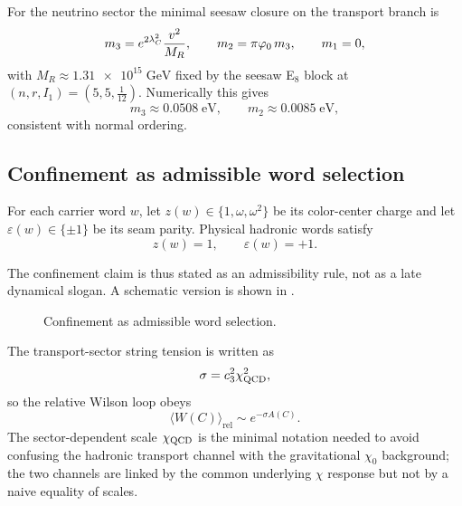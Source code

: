 For the neutrino sector the minimal seesaw closure on the transport branch is
\begin{equation}
\label{eq:neutrino-masses}
m_3=e^{2\lambda_C^2}\frac{v^2}{M_R},
\qquad
m_2=\pi\varphi_0\,m_3,
\qquad
m_1=0,
\end{equation}
with $M_R\approx\num{1.31e15}\;\mathrm{GeV}$ fixed by the seesaw E$_8$ block at $(n,r,I_1)=(5,5,\frac{1}{12})$. Numerically this gives
\[
m_3\approx\num{0.0508}\;\mathrm{eV},
\qquad
m_2\approx\num{0.0085}\;\mathrm{eV},
\]
consistent with normal ordering.

\subsection{Confinement as admissible word selection}

\begin{proposition}
For each carrier word $w$, let $z(w)\in\{1,\omega,\omega^2\}$ be its color-center charge and let $\varepsilon(w)\in\{\pm1\}$ be its seam parity. Physical hadronic words satisfy
\[
z(w)=1,
\qquad
\varepsilon(w)=+1.
\]
\end{proposition}

The confinement claim is thus stated as an admissibility rule, not as a late dynamical slogan. A schematic version is shown in .

\begin{figure}[t]
\centering
{}
\caption{Confinement as admissible word selection.}
\label{fig:admissible-words}
\end{figure}

The transport-sector string tension is written as
\[
\sigma=c_3^2\chi_{\mathrm{QCD}}^2,
\]
so the relative Wilson loop obeys
\[
\langle W(C)\rangle_{\mathrm{rel}}\sim e^{-\sigma A(C)}.
\]
The sector-dependent scale $\chi_{\mathrm{QCD}}$ is the minimal notation needed to avoid confusing the hadronic transport channel with the gravitational $\chi_0$ background; the two channels are linked by the common underlying $\chi$ response but not by a naive equality of scales.

